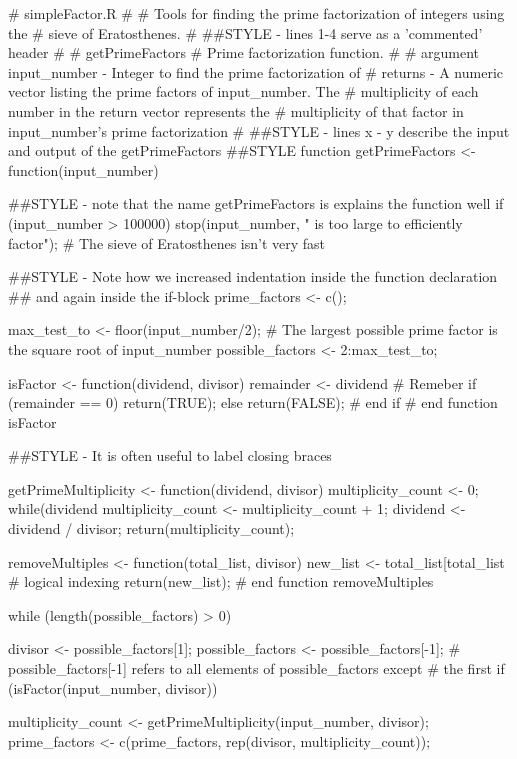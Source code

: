 \documentclass[10pt,letterpaper]{article}
\begin{document}
\begin{Schunk}
\begin{Sinput}
 # simpleFactor.R
 #
 # Tools for finding the prime factorization of integers using the
 # sieve of Eratosthenes.
 #
 ##STYLE - lines 1-4 serve as a 'commented' header
 #
 # getPrimeFactors
 # Prime factorization function.
 #
 # argument input_number - Integer to find the prime factorization of
 # returns - A numeric vector listing the prime factors of input_number.  The
 #           multiplicity of each number in the return vector represents the
 #           multiplicity of that factor in input_number's prime factorization
 #
 ##STYLE - lines x - y describe the input and output of the getPrimeFactors
 ##STYLE   function
 getPrimeFactors <- function(input_number) {
   ##STYLE - note that the name getPrimeFactors is explains the function well
   if (input_number > 100000) {
     stop(input_number, " is too large to efficiently factor\n");
   }                             # The sieve of Eratosthenes isn't very fast
 
   ##STYLE - Note how we increased indentation inside the function declaration
   ##        and again inside the if-block
   prime_factors <- c();
 
   max_test_to <- floor(input_number/2);
   # The largest possible prime factor is the square root of input_number
   possible_factors <- 2:max_test_to;
 
   isFactor <- function(dividend, divisor) {
     remainder <- dividend %% divisor;
     # Remeber %% is the modular divisior operator
     if (remainder == 0) {
       return(TRUE);
     } else {
       return(FALSE);
     }                                 # end if
   }                                   # end function isFactor
 
   ##STYLE - It is often useful to label closing braces
 
   getPrimeMultiplicity <- function(dividend, divisor) {
     multiplicity_count <- 0;
     while(dividend %% divisor == 0) {
       multiplicity_count <- multiplicity_count + 1;
       dividend <- dividend / divisor;
     }
     return(multiplicity_count);
   }
 
   removeMultiples <- function(total_list, divisor) {
     new_list <- total_list[total_list %% divisor != 0];
     # logical indexing
     return(new_list);
   }                                   # end function removeMultiples
 
   while (length(possible_factors) > 0) {
     divisor <- possible_factors[1];
     possible_factors <- possible_factors[-1];
     # possible_factors[-1] refers to all elements of possible_factors except
     #        the first
     if (isFactor(input_number, divisor)) {
       multiplicity_count <- getPrimeMultiplicity(input_number, divisor);
       prime_factors <- c(prime_factors, rep(divisor,
                                             multiplicity_count));
 
}}
\end{Sinput}
\end{Schunk}
\end{document}
